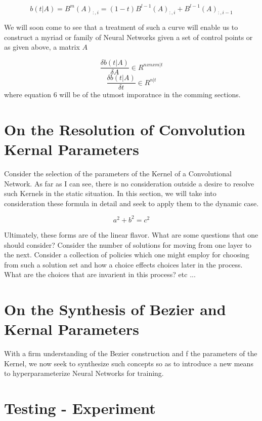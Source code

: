 \documentclass{article}
\begin{document}
\begin{equation}
  b(t|A) = B^m(A)_{:, i} = (1-t)B^{l-1}(A)_{:,i} + B^{l-1}(A)_{:,i-1}
\end{equation}

We will soon come to see that a treatment of such a curve will enable us to construct a myriad or family of Neural Networks
given a set of control points or as given above, a matrix \(A\)

\begin{equation}
	\frac{\delta b(t|A)}{\delta A} \in R^{nxnxm|t}
\end{equation}
\begin{equation}
	\frac{\delta b(t|A)}{\delta t} \in R^{n|t}
\end{equation}
where equation 6 will be of the utmost imporatnce in the comming sections.

\section{On the Resolution of Convolution Kernal Parameters}
Consider the selection of the parameters of the Kernel of a Convolutional Network. As far as I can see, there is no consideration outside
a desire to resolve such Kernels in the static situation. In this section, we will take into consideration these formula in detail and seek 
to apply them to the dynamic case.

\begin{equation}
	a^2 + b^2 = c^2
\end{equation}

Ultimately, these forms are of the linear flavor. What are some questions that one should consider? Consider the number of solutions for moving
from one layer to the next. Consider a collection of policies which one might employ for choosing from such a solution set and how a choice effects
choices later in the process. What are the choices that are invarient in this process? etc ...

\section{On the Synthesis of Bezier and Kernal Parameters}
With a firm understanding of the Bezier construction and f the parameters of the Kernel, we now seek to synthesize such concepts so as to introduce
a new means to hyperparameterize Neural Networks for training.

\section{Testing - Experiment}
\end{document}
